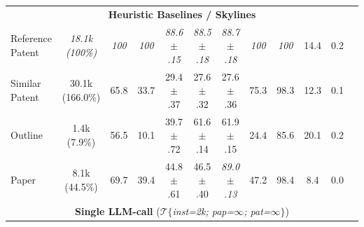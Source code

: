 \begin{table}[t]
{\begin{tabular}{lccccccccccc}
        \multicolumn{12}{c}{\textbf{Heuristic Baselines / Skylines}}\vspace{.5em}                                                                                                      \\
        Reference Patent
                              & \textit{18.1k (100\%)}
                              & \textit{100}
                              & \textit{100}
                              & \textit{88.6 $\pm$ .15}
                              & \textit{88.5 $\pm$ .18}
                              & \textit{88.7 $\pm$ .18}
                              & \textit{100}
                              & \textit{100}
                              & 14.4
                              & 0.2
        \\
        Similar Patent
                              & 30.1k (166.0\%)
                              & 65.8
                              & 33.7
                              & 29.4 $\pm$ .37
                              & 27.6 $\pm$ .32
                              & 27.6 $\pm$ .36
                              & 75.3
                              & 98.3
                              & 12.3
                              & 0.1
        \\
        Outline
                              & 1.4k (7.9\%)
                              & 56.5
                              & 10.1
                              & 39.7 $\pm$ .72
                              & 61.6 $\pm$ .14
                              & 61.9 $\pm$ .15
                              & 24.4
                              & 85.6
                              & 20.1
                              & 0.2
        \\
        Paper
                              & 8.1k (44.5\%)
                              & 69.7
                              & 39.4
                              & 44.8 $\pm$ .61
                              & 46.5 $\pm$ .40
                              & \textit{89.0 $\pm$ .13}
                              & 47.2
                              & 98.4
                              & 8.4
                              & 0.0
        \\
        \cmidrule{1-11}
        \multicolumn{12}{c}{\textbf{Single LLM-call} ($\mathcal{T}$\textit{$\{$inst=2k; pap=$\infty$; pat=$\infty\}$})}\vspace{.5em}                                                                                                          \\

\end{tabular}}
\end{table}
